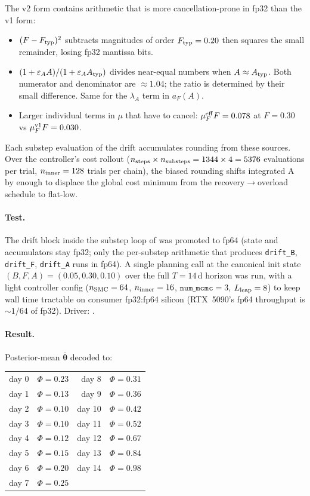 \documentclass[11pt,a4paper]{article}
\begin{document}
The v2 form contains arithmetic that is more cancellation-prone in
fp32 than the v1 form:
\begin{itemize}[itemsep=2pt]
\item $(F - F_{\rm typ})^2$ subtracts magnitudes of order $F_{\rm typ}=0.20$
  then squares the small remainder, losing fp32 mantissa bits.
\item $(1 + \varepsilon_A A) / (1 + \varepsilon_A A_{\rm typ})$ divides
  near-equal numbers when $A \approx A_{\rm typ}$. Both numerator and
  denominator are $\approx 1.04$; the ratio is determined by their
  small difference. Same for the $\lambda_A$ term in $a_F(A)$.
\item Larger individual terms in $\mu$ that have to cancel:
  $\mu_F^{\rm eff} F = 0.078$ at $F=0.30$ vs $\mu_F^{\rm v1} F = 0.030$.
\end{itemize}
Each substep evaluation of the drift accumulates rounding from these
sources. Over the controller's cost rollout
($n_{\rm steps} \times n_{\rm substeps} = 1344 \times 4 = 5376$
evaluations per trial, $n_{\rm inner}=128$ trials per chain), the
biased rounding shifts integrated A by enough to displace the global
cost minimum from the recovery$\to$overload schedule to flat-low.

\paragraph{Test.} The drift block inside the substep loop of
 was promoted to fp64 (state and
accumulators stay fp32; only the per-substep arithmetic that produces
\texttt{drift\_B}, \texttt{drift\_F}, \texttt{drift\_A} runs in fp64).
A single planning call at the canonical init state
$(B,F,A)=(0.05,0.30,0.10)$ over the full $T=14$\,d horizon was run,
with a light controller config
($n_{\rm SMC}=64$, $n_{\rm inner}=16$, $\texttt{num\_mcmc}=3$,
$L_{\rm leap}=8$) to keep wall time tractable on consumer fp32:fp64
silicon (RTX~5090's fp64 throughput is $\sim 1/64$ of fp32). Driver:
.

\paragraph{Result.} Posterior-mean $\bar{\bm\theta}$ decoded to:

\begin{tabular}{@{}rl@{\qquad}rl@{}}
day 0 & $\Phi = 0.23$ & day 8  & $\Phi = 0.31$ \\
day 1 & $\Phi = 0.13$ & day 9  & $\Phi = 0.36$ \\
day 2 & $\Phi = 0.10$ & day 10 & $\Phi = 0.42$ \\
day 3 & $\Phi = 0.10$ & day 11 & $\Phi = 0.52$ \\
day 4 & $\Phi = 0.12$ & day 12 & $\Phi = 0.67$ \\
day 5 & $\Phi = 0.15$ & day 13 & $\Phi = 0.84$ \\
day 6 & $\Phi = 0.20$ & day 14 & $\Phi = 0.98$ \\
day 7 & $\Phi = 0.25$ & & \\
\end{tabular}
\vspace{2pt}
\end{document}
